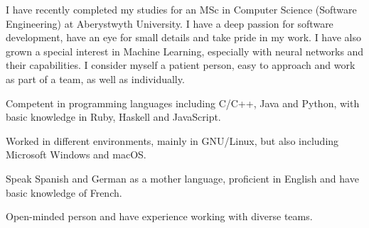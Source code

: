 \documentclass[12pt,a4paper,oneside,final]{scrartcl}
\begin{document}



I have recently completed my studies for an MSc in Computer Science (Software Engineering) at Aberystwyth University. I have a deep passion for software development, have an eye for small details and take pride in my work. I have also grown a special interest in Machine Learning, especially with neural networks and their capabilities. I consider myself a patient person, easy to approach and work as part of a team, as well as individually.



\begin{description}[noitemsep]
    \item [Software development] Competent in programming languages including C/C++, Java and Python, with basic knowledge in Ruby, Haskell and JavaScript.
    \item [Operating systems] Worked in different environments, mainly in GNU/Linux, but also including Microsoft Windows and macOS.
    \item [Languages] Speak Spanish and German as a mother language, proficient in English and have basic knowledge of French.
    \item [Social skills] Open-minded person and have experience working with diverse teams.
\end{description}


\end{document}
